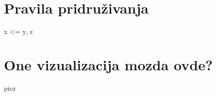 \documentclass[a4paper]{article}
\theoremstyle{definition}
\begin{document}
\section{Pravila pridruživanja}
\label{sec:pravila}

x <= {y, z}

\section{One vizualizacija mozda ovde?}
\label{sec:dod}

picz
\begin{comment}

\newlength{\figWidth}
\setlength{\figWidth}{0.45\textwidth}
\begin{figure}[h!]
\centering
\begin{subfigure}[t]{\figWidth}
    \texttt{[image: accuracy\_a.png]}
    \caption{Sa svim atributima}

\end{subfigure}
~
\begin{subfigure}[t]{\figWidth}
    \texttt{[image: accuracy\_b.png]}
    \caption{Sa redukovanim skupom atributa}

\end{subfigure}

\caption{Preciznost klasifikacije u zavisnosti od algoritma}

\label{fig:acc}
\end{figure}

\begin{figure}[h!]
\centering
\begin{subfigure}[t]{\figWidth}
    \texttt{[image: false\_pos\_a.png]}
    \caption{Sa svim atributima}

\end{subfigure}
~
\begin{subfigure}[t]{\figWidth}
    \texttt{[image: false\_pos\_b.png]}
    \caption{Sa redukovanim skupom atributa}

\end{subfigure}

\caption{Udeo lažno pozitivnih instanci u zavisnosti od algoritma}

\label{fig:falsePos}
\end{figure}


\end{comment}
\end{document}

